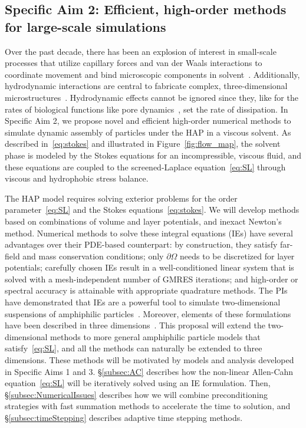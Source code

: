 \subsection{Specific Aim 2: Efficient, high-order methods for
large-scale simulations}
Over the past decade, there has been an explosion of interest in
small-scale processes that utilize capillary forces and van der Waals
interactions to coordinate movement and bind microscopic components in
solvent~\cite{Pandey2011, Zhang2017, Siontorou2017}. Additionally,
hydrodynamic interactions are central to fabricate complex,
three-dimensional microstructures~\cite{Dasgupta2017, Leong2007,
Reynolds2019, Cho2010}. Hydrodynamic effects cannot be ignored since
they, like for the rates of biological functions like pore
dynamics~\cite{RYHAM20112929}, set the rate of dissipation. In Specific
Aim 2, we propose novel and efficient high-order numerical methods to
simulate dynamic assembly of particles under the HAP in a viscous
solvent. As described in~\eqref{eq:stokes} and illustrated in
Figure~\ref{fig:flow_map}, the solvent phase is modeled by the Stokes
equations for an incompressible, viscous fluid, and these equations are
coupled to the screened-Laplace equation~\eqref{eq:SL} through viscous
and hydrophobic stress balance. 
 
The HAP model requires solving exterior problems for the order
parameter~\eqref{eq:SL} and the Stokes equations~\eqref{eq:stokes}. We
will develop methods based on combinations of volume and layer
potentials, and inexact Newton's method. Numerical methods to solve
these integral equations (IEs) have several advantages over their
PDE-based counterpart: by construction, they satisfy far-field and mass
conservation conditions; only $\partial\Omega$ needs to be discretized
for layer potentials; carefully chosen IEs result in a well-conditioned
linear system that is solved with a mesh-independent number of GMRES
iterations; and high-order or spectral accuracy is attainable with
appropriate quadrature methods. The PIs have demonstrated that IEs are a
powerful tool to simulate two-dimensional suspensions of amphiphilic
particles~\cite{Fu2018_SIAM, FuQuRyYo20}. Moreover, elements of these
formulations have been described in three dimensions~\cite{ying_2006,
manasthesis, rac-gre2016}. This proposal will extend the two-dimensional
methods to more general amphiphilic particle models that
satisfy~\eqref{eq:SL}, and all the methods can naturally be extended to
three dimensions. These methods will be motivated by models and analysis
developed in Specific Aims 1 and 3. \S\ref{subsec:AC} describes how the
non-linear Allen-Cahn equation~\eqref{eq:SL} will be iteratively solved
using an IE formulation. Then, \S\ref{subsec:NumericalIssues} describes
how we will combine preconditioning strategies with fast summation
methods to accelerate the time to solution, and
\S\ref{subsec:timeStepping} describes adaptive time stepping methods.

